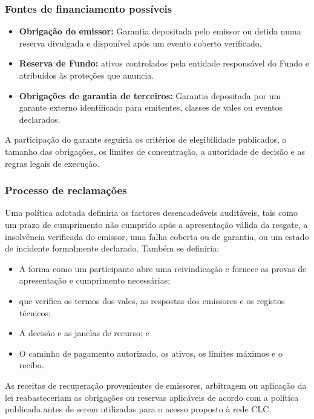\documentclass[11pt]{article}
\begin{document}
\subsubsection*{Fontes de financiamento possíveis}

\begin{itemize}[leftmargin=*]
\item \textbf{Obrigação do emissor:} Garantia depositada pelo emissor ou detida numa reserva divulgada e disponível após um evento coberto verificado.
\item \textbf{Reserva de Fundo:} ativos controlados pela entidade responsável do Fundo e atribuídos às proteções que anuncia.
\item \textbf{Obrigações de garantia de terceiros:} Garantia depositada por um garante externo identificado para emitentes, classes de vales ou eventos declarados.
\end{itemize}
A participação do garante seguiria os critérios de elegibilidade publicados, o tamanho das obrigações, os limites de concentração, a autoridade de decisão e as regras legais de execução.

\subsubsection*{Processo de reclamações}

Uma política adotada definiria os factores desencadeáveis auditáveis, tais como um prazo de cumprimento não cumprido após a apresentação válida da resgate, a insolvência verificada do emissor, uma falha coberta ou de garantia, ou um estado de incidente formalmente declarado. Também se definiria:

\begin{itemize}[leftmargin=*]
\item A forma como um participante abre uma reivindicação e fornece as provas de apresentação e cumprimento necessárias;
\item que verifica os termos dos vales, as respostas dos emissores e os registos técnicos;
\item A decisão e as janelas de recurso; e
\item O caminho de pagamento autorizado, os ativos, os limites máximos e o recibo.
\end{itemize}
As receitas de recuperação provenientes de emissores, arbitragem ou aplicação da lei reabasteceriam as obrigações ou reservas aplicáveis de acordo com a política publicada antes de serem utilizadas para o acesso proposto à rede CLC.
\end{document}
